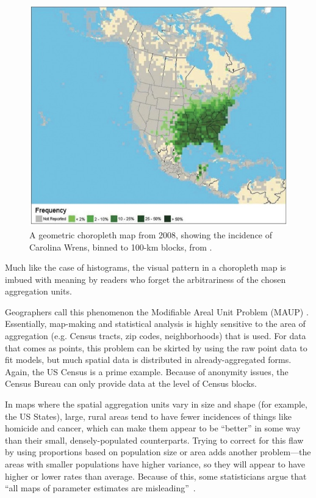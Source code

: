 \documentclass{article}\usepackage[]{graphicx}\usepackage[]{color}
\begin{document}
\begin{figure}[htbp]
\begin{centering}
\includegraphics[height=0.4\textheight]{../img/wren}
\caption{A geometric choropleth map from 2008, showing the incidence of Carolina Wrens, binned to 100-km blocks, from \cite{SulTelWoo2008}.}\label{wren}
\end{centering}
\end{figure}


Much like the case of histograms, the visual pattern in a choropleth map is imbued with meaning by readers who forget the arbitrariness of the chosen aggregation units. 



Geographers call this phenomenon the Modifiable Areal Unit Problem (MAUP) \citep{Erv2015}. Essentially, map-making and statistical analysis is highly sensitive to the area of aggregation (e.g. Census tracts, zip codes, neighborhoods) that is used. For data that comes as points, this problem can be skirted by using the raw point data to fit models, but much spatial data is distributed in already-aggregated forms. Again, the US Census is a prime example. Because of anonymity issues, the Census Bureau can only provide data at the level of Census blocks. 

In maps where the spatial aggregation units vary in size and shape (for example, the US States), large, rural areas tend to have fewer incidences of things like homicide and cancer, which can make them appear to be ``better'' in some way than their small, densely-populated counterparts. Trying to correct for this flaw by using proportions based on population size or area adds another problem---the areas with smaller populations have higher variance, so they will appear to have higher or lower rates than average. Because of this, some statisticians argue that ``all maps of parameter estimates are misleading''~\citep{GelPri1999}. 
\end{document}
